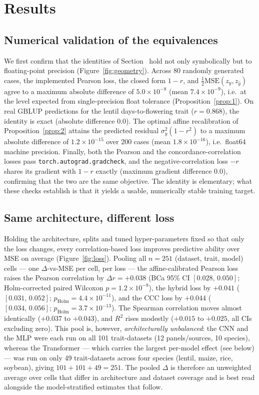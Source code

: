 \section{Results}\label{sec:results}

\subsection{Numerical validation of the equivalences}\label{sec:res-numerical}
We first confirm that the identities of Section~ hold not only
symbolically but to floating-point precision (Figure~\ref{fig:geometry}). Across
80 randomly generated cases, the implemented Pearson loss, the closed form $1-r$,
and $\tfrac12\mathrm{MSE}(z_y,z_{\hat y})$ agree to a maximum absolute difference
of $5.0\times10^{-8}$ (mean $7.4\times10^{-9}$), i.e.\ at the level expected from
single-precision float tolerance (Proposition~\ref{prop:1}). On real GBLUP
predictions for the lentil days-to-flowering trait ($r=0.868$), the identity is
exact (absolute difference $0.0$). The optimal affine recalibration of
Proposition~\ref{prop:2} attains the predicted residual $\sigma_y^2(1-r^2)$ to a
maximum absolute difference of $1.2\times10^{-15}$ over 200 cases (mean
$1.8\times10^{-16}$), i.e.\ float64 machine precision. Finally, both the Pearson
and the concordance-correlation losses pass \texttt{torch.autograd.gradcheck},
and the negative-correlation loss $-r$ shares its gradient with $1-r$ exactly
(maximum gradient difference $0.0$), confirming that the two are the same
objective. The identity is elementary; what these checks establish is that it
yields a usable, numerically stable training target.

\subsection{Same architecture, different loss}\label{sec:res-loss}
Holding the architecture, splits and tuned hyper-parameters fixed so that only
the loss changes, every correlation-based loss improves predictive ability over
MSE on average (Figure~\ref{fig:loss}). Pooling all $n=251$ (dataset, trait, model)
cells --- one $\Delta$-vs-MSE per cell, per loss --- the affine-calibrated Pearson loss raises the Pearson correlation
by $\Delta r = +0.038$ (BCa 95\% CI $[0.028,\,0.050]$; Holm-corrected paired
Wilcoxon $p=1.2\times10^{-8}$), the hybrid loss by $+0.041$ ($[0.031,\,0.052]$;
$p_{\mathrm{Holm}}=4.4\times10^{-11}$), and the CCC loss by $+0.044$
($[0.034,\,0.056]$; $p_{\mathrm{Holm}}=3.7\times10^{-13}$). The Spearman
correlation moves almost identically ($+0.037$ to $+0.043$), and $R^2$ rises
modestly ($+0.015$ to $+0.025$, all CIs excluding zero). This pool is, however,
\emph{architecturally unbalanced}: the CNN and the MLP were each run on all 101
trait-datasets (12 panels/sources, 10 species), whereas the Transformer --- which carries the
largest per-model effect (see below) --- was run on only 49 trait-datasets across
four species (lentil, maize, rice, soybean), giving $101+101+49=251$. The pooled
$\Delta$ is therefore an unweighted average over cells that differ in
architecture and dataset coverage and is best read alongside the model-stratified
estimates that follow.

